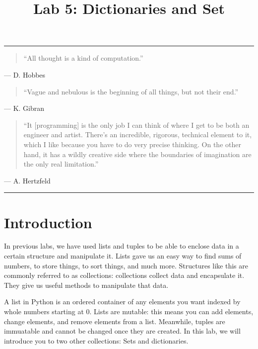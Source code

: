 \documentclass[11pt]{cselabheader}
\title{Lab 5: Dictionaries and Set}
\begin{document}
\maketitle
{}
\hrule

\begin{quotation}
``All thought is a kind of computation.''
\end{quotation}
\begin{flushright}
--- D. Hobbes
\end{flushright}

\begin{quotation}
``Vague and nebulous is the beginning of all things, but not their end.''
\end{quotation}
\begin{flushright}
--- K. Gibran
\end{flushright}

\begin{quotation}
``It [programming] is the only job I can think of where I get to be both an
engineer and artist. There's an incredible, rigorous, technical element to it,
which I like because you have to do very precise thinking. On the other hand, it
has a wildly creative side where the boundaries of imagination are the only real
limitation.''
\end{quotation}
\begin{flushright}
--- A. Hertzfeld
\end{flushright}

\hrule

\section{Introduction}

In previous labs, we have used lists and tuples to be able to enclose data
in a certain
structure and manipulate it. Lists gave us an easy way to find sums of numbers,
to store things, to sort things, and much more. Structures like this are
commonly referred to as collections: collections collect data and encapsulate
it. They give us useful methods to manipulate that data.

A list in Python is an ordered container of any elements you want indexed by
whole numbers starting at 0. Lists are mutable: this means you can add elements,
change elements, and remove elements from a list. Meanwhile, tuples are immuatable
and cannot be changed once they are created.
In this lab, we will introduce you to two other collections: Sets and dictionaries.
\end{document}
